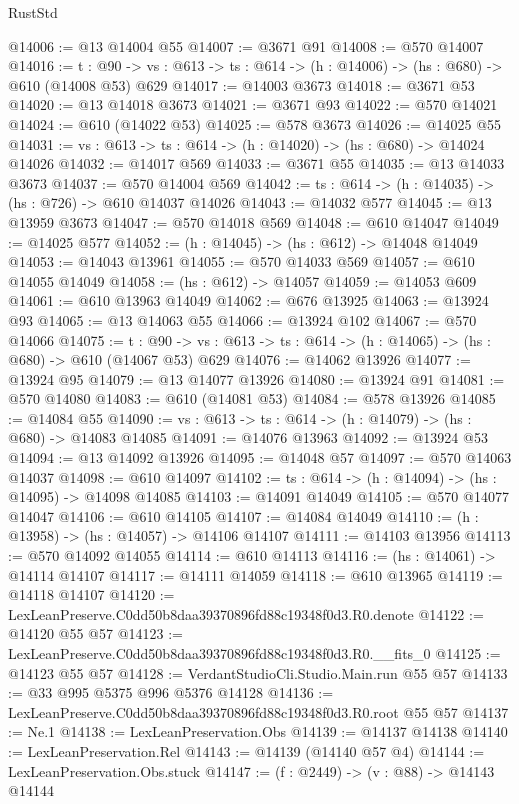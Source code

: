 \begin{lexlean}{RustStd}
\begin{coremodule}
@14006 := @13 @14004 @55
@14007 := @3671 @91
@14008 := @570 @14007
@14016 := {t : @90} ->
  {vs : @613} -> {ts : @614} -> (h : @14006) -> (hs : @680) -> @610 (@14008 @53) @629
@14017 := @14003 @3673
@14018 := @3671 @53
@14020 := @13 @14018 @3673
@14021 := @3671 @93
@14022 := @570 @14021
@14024 := @610 (@14022 @53)
@14025 := @578 @3673
@14026 := @14025 @55
@14031 := {vs : @613} -> {ts : @614} -> (h : @14020) -> (hs : @680) -> @14024 @14026
@14032 := @14017 @569
@14033 := @3671 @55
@14035 := @13 @14033 @3673
@14037 := @570 @14004 @569
@14042 := {ts : @614} -> (h : @14035) -> (hs : @726) -> @610 @14037 @14026
@14043 := @14032 @577
@14045 := @13 @13959 @3673
@14047 := @570 @14018 @569
@14048 := @610 @14047
@14049 := @14025 @577
@14052 := (h : @14045) -> (hs : @612) -> @14048 @14049
@14053 := @14043 @13961
@14055 := @570 @14033 @569
@14057 := @610 @14055 @14049
@14058 := (hs : @612) -> @14057
@14059 := @14053 @609
@14061 := @610 @13963 @14049
@14062 := @676 @13925
@14063 := @13924 @93
@14065 := @13 @14063 @55
@14066 := @13924 @102
@14067 := @570 @14066
@14075 := {t : @90} ->
  {vs : @613} -> {ts : @614} -> (h : @14065) -> (hs : @680) -> @610 (@14067 @53) @629
@14076 := @14062 @13926
@14077 := @13924 @95
@14079 := @13 @14077 @13926
@14080 := @13924 @91
@14081 := @570 @14080
@14083 := @610 (@14081 @53)
@14084 := @578 @13926
@14085 := @14084 @55
@14090 := {vs : @613} -> {ts : @614} -> (h : @14079) -> (hs : @680) -> @14083 @14085
@14091 := @14076 @13963
@14092 := @13924 @53
@14094 := @13 @14092 @13926
@14095 := @14048 @57
@14097 := @570 @14063 @14037
@14098 := @610 @14097
@14102 := {ts : @614} -> (h : @14094) -> (hs : @14095) -> @14098 @14085
@14103 := @14091 @14049
@14105 := @570 @14077 @14047
@14106 := @610 @14105
@14107 := @14084 @14049
@14110 := (h : @13958) -> (hs : @14057) -> @14106 @14107
@14111 := @14103 @13956
@14113 := @570 @14092 @14055
@14114 := @610 @14113
@14116 := (hs : @14061) -> @14114 @14107
@14117 := @14111 @14059
@14118 := @610 @13965
@14119 := @14118 @14107
@14120 := LexLeanPreserve.C0dd50b8daa39370896fd88c19348f0d3.R0.denote
@14122 := @14120 @55 @57
@14123 := LexLeanPreserve.C0dd50b8daa39370896fd88c19348f0d3.R0.__fits_0
@14125 := @14123 @55 @57
@14128 := VerdantStudioCli.Studio.Main.run @55 @57
@14133 := @33 @995 @5375 @996 @5376 @14128
@14136 := LexLeanPreserve.C0dd50b8daa39370896fd88c19348f0d3.R0.root @55 @57
@14137 := Ne.{1}
@14138 := LexLeanPreservation.Obs
@14139 := @14137 @14138
@14140 := LexLeanPreservation.Rel
@14143 := @14139 (@14140 @57 @4)
@14144 := LexLeanPreservation.Obs.stuck
@14147 := (f : @2449) -> (v : @88) -> @14143 @14144

\end{coremodule}
\end{lexlean}
